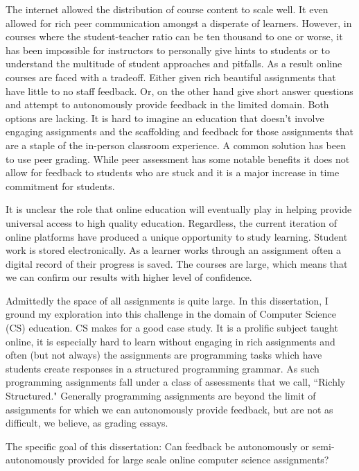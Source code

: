 The internet allowed the distribution of course content to scale well. It even allowed for rich peer communication amongst a disperate of learners. However, in courses where the student-teacher ratio can be ten thousand to one or worse, it has been impossible for instructors to personally give hints to students or to understand the multitude of student approaches and pitfalls. As a result online courses are faced with a tradeoff. Either given rich beautiful assignments that have little to no staff feedback. Or, on the other hand give short answer questions and attempt to autonomously provide feedback in the limited domain. Both options are lacking. It is hard to imagine an education that doesn't involve engaging assignments and the scaffolding and feedback for those assignments that are a staple of the in-person classroom experience. A common solution has been to use peer grading. While peer assessment has some notable benefits it does not allow for feedback to students who are stuck and it is a major increase in time commitment for students.

It is unclear the role that online education will eventually play in helping provide universal access to high quality education. Regardless, the current iteration of online platforms have produced a unique opportunity to study learning. Student work is stored electronically. As a learner works through an assignment often a digital record of their progress is saved. The courses are large, which means that we can confirm our results with higher level of confidence. 

Admittedly the space of all assignments is quite large. In this dissertation, I ground my exploration into this challenge in the domain of Computer Science (CS) education. CS makes for a good case study. It is a prolific subject taught online, it is especially hard to learn without engaging in rich assignments and often (but not always) the assignments are programming tasks which have students create responses in a structured programming grammar. As such programming assignments fall under a class of assessments that we call, ``Richly Structured." Generally programming assignments are beyond the limit of assignments for which we can autonomously provide feedback, but are not as difficult, we believe, as grading essays.

\begin{mdframed}
The specific goal of this dissertation: Can feedback be autonomously or semi-autonomously provided for large scale online computer science assignments?
\end{mdframed}

